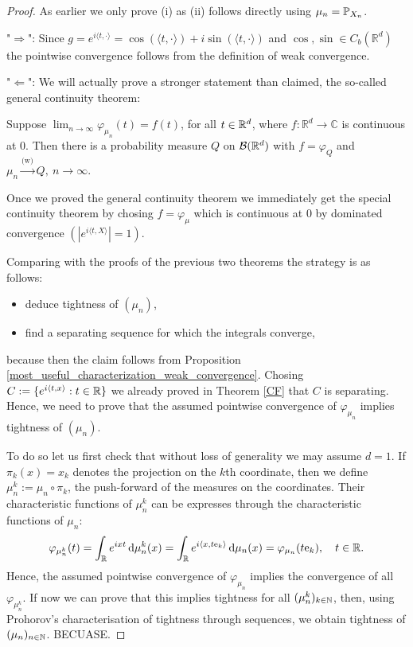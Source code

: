 \begin{proof}[Proof]
As earlier we only prove (i) as (ii) follows directly using $\mu_n=\P_{X_n}$.\smallskip

"$\Rightarrow$": Since $g = e^{i \langle t, \cdot \rangle}=\cos(\langle t,\cdot\rangle)+i\sin(\langle t,\cdot\rangle)$ and $\cos,\sin\in C_b(\mathbb{R}^d)$ the pointwise convergence follows from the definition of weak convergence.\smallskip

"$\Leftarrow$": We will actually prove a stronger statement than claimed, the so-called general continuity theorem:
\begin{lwarnhinweis}
	Suppose $\lim_{n\to\infty}\varphi_{\mu_n}(t)= f(t)$, for all $t\in\R^d$, where $f \colon \mathbb{R}^d \to \mathbb{C}$ is continuous at $0$. Then there is a probability measure $Q$ on $\cB(\R^d)$ with $f = \varphi_Q$ and $\mu_n \overset{\text{(w)}}{\longrightarrow} Q, \: n\to \infty$.
\end{lwarnhinweis}
Once we proved the general continuity theorem we immediately get the special continuity theorem by chosing $f=\varphi_\mu$ which is continuous at $0$ by dominated convergence $(|e^{i\langle t,X\rangle}|=1)$.\smallskip

Comparing with the proofs of the previous two theorems the strategy is as follows:
\begin{itemize}
	\item deduce tightness of $(\mu_n)$,
	\item find a separating sequence for which the integrals converge,
\end{itemize}
because then the claim follows from Proposition \ref{most_useful_characterization_weak_convergence}. Chosing $C:=\{e^{i\langle t,x\rangle}: t\in\R\}$ we already proved in Theorem \ref{CF} that $C$ is separating. Hence, we need to prove that the assumed pointwise convergence of $\varphi_{\mu_n}$ implies tightness of $(\mu_n)$.\smallskip

To do so let us first check that without loss of generality we may assume $d=1$. If $\pi_k(x)=x_k$ denotes the projection on the $k$th coordinate, then we define $\mu_n^k:= \mu_n\circ \pi_k$, the push-forward of the measures on the coordinates. Their characteristic functions of $\mu_n^k$ can be expresses through the characteristic functions of $\mu_n$:
\begin{align*}
	\varphi_{\mu_n^{k}}(t) = \int_{\mathbb{R}} e^{ixt} \dint \mu_n^k(x)
		=  \int_{\mathbb{R}} e^{i \langle x , t  \text{e}_k \rangle} \dint \mu_n(x)
		= \varphi_{\mu_n}(t  \text{e}_k),\quad t\in\R.
\end{align*}
Hence, the assumed pointwise convergence of $\varphi_{\mu_n}$ implies the convergence of all $\varphi_{\mu_n^k}$. If now we can prove that this implies tightness for all $(\mu_n^k)_{k\in\N}$, then, using Prohorov's characterisation of tightness through sequences, we obtain tightness of $(\mu_n)_{n\in\N}$. BECUASE.\smallskip 


\end{proof}
